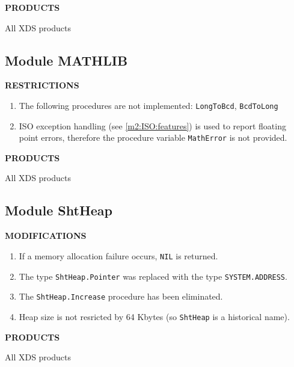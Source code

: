 {\bf PRODUCTS}

All XDS products


\subsection{Module MATHLIB}

{\bf RESTRICTIONS}

\begin{enumerate}
\item The following procedures are not implemented:
      \verb'LongToBcd',
      \verb'BcdToLong'

\item ISO \mt{} exception handling (see \ref{m2:ISO:features})
      is used to report floating point errors,
      therefore the procedure variable \verb'MathError' is not provided.
\end{enumerate}

{\bf PRODUCTS}

All XDS products


\subsection{Module ShtHeap}

{\bf MODIFICATIONS}

\begin{enumerate}
\item If a memory allocation failure occurs, \verb'NIL' is returned.

\item The type \verb'ShtHeap.Pointer' was replaced with the type
      \verb'SYSTEM.ADDRESS'.

\item The \verb'ShtHeap.Increase' procedure has been eliminated.

\item Heap size is not resricted by 64 Kbytes (so \verb'ShtHeap' is a 
      historical name).
\end{enumerate}

{\bf PRODUCTS}

All XDS products



